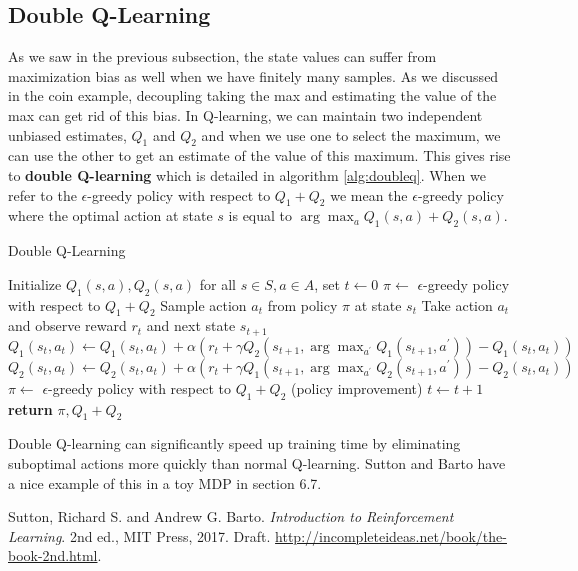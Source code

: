 \documentclass{article}
\theoremstyle{definition}
\theoremstyle{remark}
\begin{document}
\subsection{Double Q-Learning}
As we saw in the previous subsection, the state values can suffer from maximization bias as well when we have finitely many samples.  As we discussed in the coin example, decoupling taking the max and estimating the value of the max can get rid of this bias.  In Q-learning, we can maintain two independent unbiased estimates, $Q_1$ and $Q_2$ and when we use one to select the maximum, we can use the other to get an estimate of the value of this maximum.  This gives rise to \textbf{double Q-learning} which is detailed in algorithm \ref{alg:doubleq}.  When we refer to the $\epsilon$-greedy policy with respect to $Q_1+Q_2$ we mean the $\epsilon$-greedy policy where the optimal action at state $s$ is equal to $\arg\max_a Q_1(s, a) + Q_2(s,a)$.

\begin{algorithm}[H]
\caption{Double Q-Learning}\label{alg:doubleq}
\begin{algorithmic}[1]
\State Initialize $Q_1(s,a), Q_2(s,a)$ for all $s \in S, a \in A$, set $t \gets 0$
\State $\pi \gets $ $\epsilon$-greedy policy with respect to $Q_1+Q_2$
\Loop
\State Sample action $a_t$ from policy $\pi$ at state $s_t$
\State Take action $a_t$ and observe reward $r_t$ and next state $s_{t+1}$
\State $Q_1(s_t, a_t) \gets Q_1(s_t, a_t) + \alpha(r_t + \gamma Q_2(s_{t+1}, \arg\max_{a^\prime}Q_1(s_{t+1}, a^\prime)) - Q_1(s_t, a_t))$
\Else
\State $Q_2(s_t, a_t) \gets Q_2(s_t, a_t) + \alpha(r_t + \gamma Q_1(s_{t+1}, \arg\max_{a^\prime}Q_2(s_{t+1}, a^\prime)) - Q_2(s_t, a_t))$
\EndIf
\State $\pi \gets $ $\epsilon$-greedy policy with respect to $Q_1+Q_2$ (policy improvement)
\State $ t \gets t+1$
\EndLoop
\State \textbf{return} $\pi, Q_1+Q_2$
\EndProcedure
\end{algorithmic}
\end{algorithm}

Double Q-learning can significantly speed up training time by eliminating suboptimal actions more quickly than normal Q-learning.  Sutton and Barto \cite{sb18} have a nice example of this in a toy MDP in section 6.7.

\begin{thebibliography}{9}

 Sutton, Richard S. and Andrew G. Barto. \emph{Introduction to Reinforcement Learning}. 2nd ed., MIT Press, 2017. Draft. \url{http://incompleteideas.net/book/the-book-2nd.html}.


\end{thebibliography}
\end{document}
